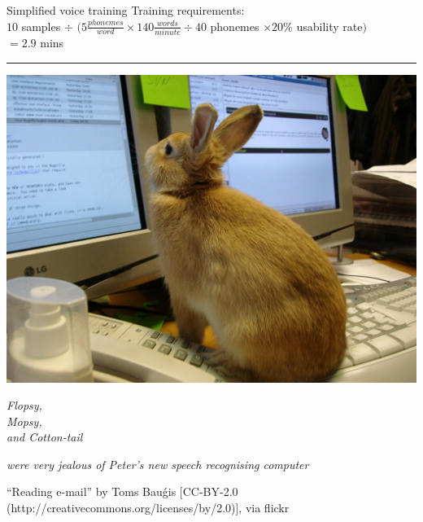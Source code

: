 \documentclass{beamer}
\begin{document}
  \begin{frame}{Simplified voice training}
    Training requirements: \\
    \footnotesize
    $10$ samples $\div$ $(5 \frac{phonemes}{word} \times 140 \frac{words}{minute} \div 40$ phonemes $\times 20\%$ usability rate{}$)$ \\
    \raggedleft
    $= 2.9$ mins
    \rule{\textwidth}{1pt}
    \begin{minipage}[c][4cm][b]{.5\textwidth}
      \includegraphics[width = .95\textwidth]{chart/prompt.jpg}
    \end{minipage}%
    \begin{minipage}[c][4cm][c]{.5\textwidth}
      \begin{flushright}
        \emph{Flopsy, \\ Mopsy, \hphantom{sy,} \\ and Cotton-tail \hphantom{sy,sy,}}
      \end{flushright}
      \emph{were very jealous of Peter's new speech recognising computer}
    \end{minipage}
    {\tiny
      \begin{spacing}{0.5}
        ``Reading e-mail'' by Toms Bau\'{g}is [CC-BY-2.0 (http://creativecommons.org/licenses/by/2.0)], via flickr
      \end{spacing}
    }
  \end{frame}
\end{document}
